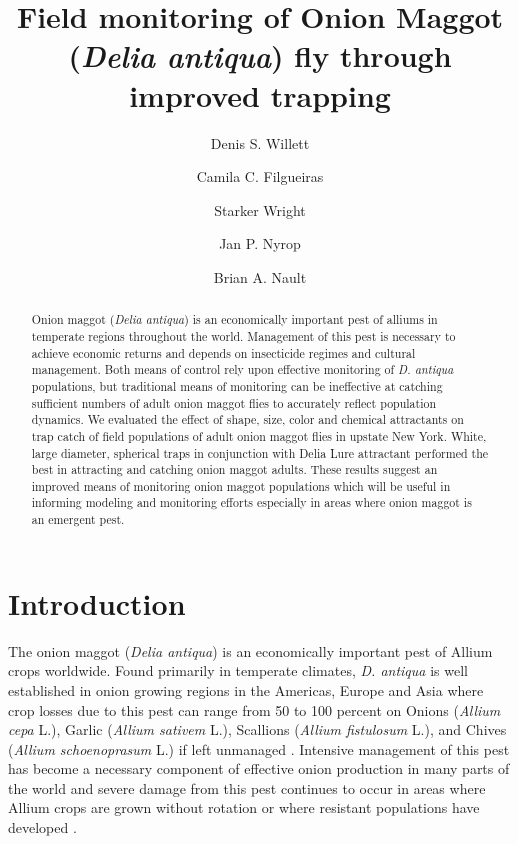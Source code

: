 \documentclass[alpha-refs]{wiley-article}
\title{Field monitoring of Onion Maggot (\textit{Delia antiqua}) fly through improved trapping}
\author[1\authfn{1}]{Denis S. Willett}
\author[1\authfn{1}]{Camila C. Filgueiras}
\author[2]{Starker Wright}
\author[1]{Jan P. Nyrop}
\author[1]{Brian A. Nault}
\affil[1]{Department of Entomology, Cornell AgriTech, Cornell University, Geneva, NY, 14456, USA}
\affil[2]{Bartlett Tree Experts, Dublin, PA, USA}
\begin{document}
\maketitle

\begin{abstract}
Onion maggot (\textit{Delia antiqua}) is an economically important pest of alliums in temperate regions throughout the world.  Management of this pest is necessary to achieve economic returns and depends on insecticide regimes and cultural management.  Both means of control rely upon effective monitoring of \textit{D. antiqua} populations, but traditional means of monitoring can be ineffective at catching sufficient numbers of adult onion maggot flies to accurately reflect population dynamics.  We evaluated the effect of shape, size, color and chemical attractants on trap catch of field populations of adult onion maggot flies in upstate New York.  White, large diameter, spherical traps in conjunction with Delia Lure attractant performed the best in attracting and catching onion maggot adults.  These results suggest an improved means of monitoring onion maggot populations which will be useful in informing modeling and monitoring efforts especially in areas where onion maggot is an emergent pest.  

\end{abstract}

\linenumbers
\section{Introduction}

The onion maggot (\textit{Delia antiqua}) is an economically important pest of Allium crops worldwide.  Found primarily in temperate climates, \textit{D. antiqua} is well established in onion growing regions in the Americas, Europe and Asia where crop losses due to this pest can range from 50 to 100 percent on Onions (\textit{Allium cepa} L.), Garlic (\textit{Allium sativem} L.), Scallions (\textit{Allium fistulosum} L.), and Chives (\textit{Allium schoenoprasum} L.) if left unmanaged \citep{ellis1979factors,ning2017predicting,nault2007ecology, nault2006performance, nault2006onion}.  Intensive management of this pest has become a necessary component of effective onion production in many parts of the world and severe damage from this pest continues to occur in areas where Allium crops are grown without rotation or where resistant populations have developed \citep{martinson1988dispersal, nault2006onion}.  
\end{document}
